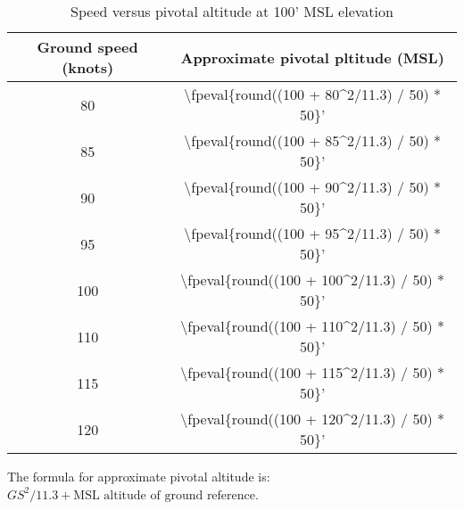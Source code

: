 \begin{table}[H]
    \caption{Speed versus pivotal altitude at 100' MSL elevation}

    \begin{center}
        \begin{tabular}{cc}
            \toprule
            \textbf{Ground speed (knots)} & \textbf{Approximate pivotal pltitude (MSL)}         \\
            \midrule
            80                            & \num{\fpeval{round((100 + 80^2/11.3) / 50) * 50}}'  \\
            85                            & \num{\fpeval{round((100 + 85^2/11.3) / 50) * 50}}'  \\
            90                            & \num{\fpeval{round((100 + 90^2/11.3) / 50) * 50}}'  \\
            95                            & \num{\fpeval{round((100 + 95^2/11.3) / 50) * 50}}'  \\
            100                           & \num{\fpeval{round((100 + 100^2/11.3) / 50) * 50}}' \\
            110                           & \num{\fpeval{round((100 + 110^2/11.3) / 50) * 50}}' \\
            115                           & \num{\fpeval{round((100 + 115^2/11.3) / 50) * 50}}' \\
            120                           & \num{\fpeval{round((100 + 120^2/11.3) / 50) * 50}}' \\
            \bottomrule
        \end{tabular}

        \hfill

        The formula for approximate pivotal altitude is: $GS^2 / 11.3 + \textrm{MSL altitude of ground reference}$.
    \end{center}
\end{table}
